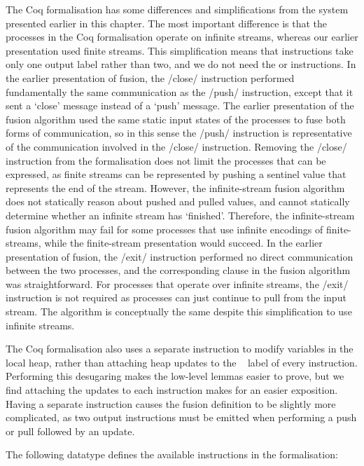 The Coq formalisation has some differences and simplifications from the system presented earlier in this chapter.
The most important difference is that the processes in the Coq formalisation operate on infinite streams, whereas our earlier presentation used finite streams.
This simplification means that \Hs@pull@ instructions take only one output label rather than two, and we do not need the \Hs@close@ or \Hs@exit@ instructions.
In the earlier presentation of fusion, the \Hs/close/ instruction performed fundamentally the same communication as the \Hs/push/ instruction, except that it sent a `close' message instead of a `push' message.
The earlier presentation of the fusion algorithm used the same static input states of the processes to fuse both forms of communication, so in this sense the \Hs/push/ instruction is representative of the communication involved in the \Hs/close/ instruction.
Removing the \Hs/close/ instruction from the formalisation does not limit the processes that can be expressed, as finite streams can be represented by pushing a sentinel value that represents the end of the stream.
However, the infinite-stream fusion algorithm does not statically reason about pushed and pulled values, and cannot statically determine whether an infinite stream has `finished'.
Therefore, the infinite-stream fusion algorithm may fail for some processes that use infinite encodings of finite-streams, while the finite-stream presentation would succeed.
In the earlier presentation of fusion, the \Hs/exit/ instruction performed no direct communication between the two processes, and the corresponding clause in the fusion algorithm was straightforward.
For processes that operate over infinite streams, the \Hs/exit/ instruction is not required as processes can just continue to pull from the input stream.
The algorithm is conceptually the same despite this simplification to use infinite streams.

The Coq formalisation also uses a separate \Hs@update@ instruction to modify variables in the local heap, rather than attaching heap updates to the \Next~ label of every instruction.
Performing this desugaring makes the low-level lemmas easier to prove, but we find attaching the updates to each instruction makes for an easier exposition.
Having a separate \Hs@update@ instruction causes the fusion definition to be slightly more complicated, as two output instructions must be emitted when performing a push or pull followed by an update.

The following datatype defines the available instructions in the formalisation:

